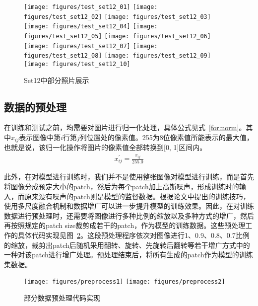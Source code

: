 \begin{figure}
	\centering
	\subcaptionbox*{}
	{\texttt{[image: figures/test\_set12\_01]}}
	\subcaptionbox*{}
	{\texttt{[image: figures/test\_set12\_02]}}
	\subcaptionbox*{}
	{\texttt{[image: figures/test\_set12\_03]}}
	\subcaptionbox*{}
	{\texttt{[image: figures/test\_set12\_04]}}
	\subcaptionbox*{}
	{\texttt{[image: figures/test\_set12\_05]}}
	\subcaptionbox*{}
	{\texttt{[image: figures/test\_set12\_06]}}
	\subcaptionbox*{}
	{\texttt{[image: figures/test\_set12\_07]}}
	\subcaptionbox*{}
	{\texttt{[image: figures/test\_set12\_08]}}
	\subcaptionbox*{}
	{\texttt{[image: figures/test\_set12\_09]}}
	\subcaptionbox*{}
	{\texttt{[image: figures/test\_set12\_10]}}
	\caption{Set12中部分照片展示}
	\label{fig:set12sample}
\end{figure}

\subsection{数据的预处理}
在训练和测试之前，均需要对图片进行归一化处理，具体公式见式~\ref{for:norm}。其中$ x_{ij} $表示图像中第$ i $行第$ j $列位置处的像素值。255为8位像素值所能表示的最大值，也就是说，该归一化操作将图片的像素值全部转换到[0, 1]区间内。
\begin{align}\label{for:norm}
	x_{ij}^{\prime} = \frac{x_{ij}}{255.0}
\end{align}

此外，在对模型进行训练时，我们并不是使用整张图像对模型进行训练，而是首先将图像分成预定大小的patch，然后为每个patch加上高斯噪声，形成训练时的输入，而原来没有噪声的patch则是模型的监督数据。根据论文中提出的训练技巧，使用多尺度融合机制和数据增广可以进一步提升模型的训练效果。因此，在对训练数据进行预处理时，还需要将图像进行多种比例的缩放以及多种方式的增广，然后再按照规定的patch size裁剪成若干的patch，作为模型的训练数据。这些预处理工作的具体代码实现见图~\ref{fig:preprocess}。这段预处理程序依次对图像进行1、0.9、0.8、0.7比例的缩放，裁剪出patch后随机采用翻转、旋转、先旋转后翻转等若干增广方式中的一种对该patch进行增广处理。预处理结束后，将所有生成的patch作为模型的训练集数据。

\begin{figure}
	\centering
	\subcaptionbox*{}
	{\texttt{[image: figures/preprocess1]}}
	\subcaptionbox*{}
	{\texttt{[image: figures/preprocess2]}}
	\caption{部分数据预处理代码实现}
	\label{fig:preprocess}
\end{figure}


